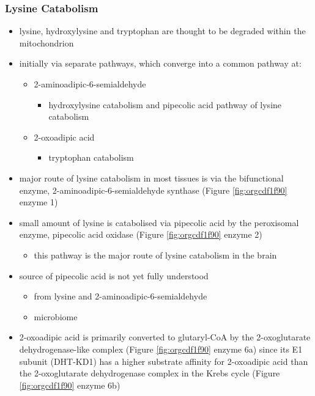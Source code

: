 \documentclass{scrartcl}
\begin{document}
\subsubsection{Lysine Catabolism}
\label{sec:org84a93d3}
\begin{itemize}
\item lysine, hydroxylysine and tryptophan are thought to be degraded
within the mitochondrion
\item initially via separate pathways, which converge into a common 
pathway at:
\begin{itemize}
\item 2-aminoadipic-6-semialdehyde
\begin{itemize}
\item hydroxylysine catabolism and pipecolic acid pathway of lysine
catabolism
\end{itemize}
\item 2-oxoadipic acid
\begin{itemize}
\item tryptophan catabolism
\end{itemize}
\end{itemize}
\item major route of lysine catabolism in most tissues is via the
bifunctional enzyme, 2-aminoadipic-6-semialdehyde synthase (Figure \ref{fig:orgcdf1f90} enzyme 1)
\item small amount of lysine is catabolised via pipecolic acid by the
peroxisomal enzyme, pipecolic acid oxidase (Figure \ref{fig:orgcdf1f90} enzyme 2)
\begin{itemize}
\item this pathway is the major route of lysine catabolism in the
brain
\end{itemize}
\item source of pipecolic acid is not yet fully understood
\begin{itemize}
\item from lysine and 2-aminoadipic-6-semialdehyde
\item microbiome
\end{itemize}

\item 2-oxoadipic acid is primarily converted to glutaryl-CoA by the
2-oxoglutarate dehydrogenase-like complex (Figure \ref{fig:orgcdf1f90} enzyme 6a)
since its E1 subunit (DHT-KD1) has a higher substrate affinity for
2-oxoadipic acid than the 2-oxoglutarate dehydrogenase complex in
the Krebs cycle (Figure \ref{fig:orgcdf1f90} enzyme 6b)


\end{itemize}
\end{document}
